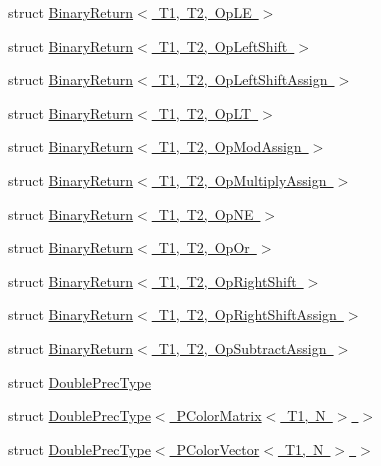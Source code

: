 \begin{DoxyCompactItemize}
\item 
struct \mbox{\hyperlink{structENSEM_1_1BinaryReturn_3_01T1_00_01T2_00_01OpLE_01_4}{Binary\+Return$<$ T1, T2, Op\+L\+E $>$}}
\item 
struct \mbox{\hyperlink{structENSEM_1_1BinaryReturn_3_01T1_00_01T2_00_01OpLeftShift_01_4}{Binary\+Return$<$ T1, T2, Op\+Left\+Shift $>$}}
\item 
struct \mbox{\hyperlink{structENSEM_1_1BinaryReturn_3_01T1_00_01T2_00_01OpLeftShiftAssign_01_4}{Binary\+Return$<$ T1, T2, Op\+Left\+Shift\+Assign $>$}}
\item 
struct \mbox{\hyperlink{structENSEM_1_1BinaryReturn_3_01T1_00_01T2_00_01OpLT_01_4}{Binary\+Return$<$ T1, T2, Op\+L\+T $>$}}
\item 
struct \mbox{\hyperlink{structENSEM_1_1BinaryReturn_3_01T1_00_01T2_00_01OpModAssign_01_4}{Binary\+Return$<$ T1, T2, Op\+Mod\+Assign $>$}}
\item 
struct \mbox{\hyperlink{structENSEM_1_1BinaryReturn_3_01T1_00_01T2_00_01OpMultiplyAssign_01_4}{Binary\+Return$<$ T1, T2, Op\+Multiply\+Assign $>$}}
\item 
struct \mbox{\hyperlink{structENSEM_1_1BinaryReturn_3_01T1_00_01T2_00_01OpNE_01_4}{Binary\+Return$<$ T1, T2, Op\+N\+E $>$}}
\item 
struct \mbox{\hyperlink{structENSEM_1_1BinaryReturn_3_01T1_00_01T2_00_01OpOr_01_4}{Binary\+Return$<$ T1, T2, Op\+Or $>$}}
\item 
struct \mbox{\hyperlink{structENSEM_1_1BinaryReturn_3_01T1_00_01T2_00_01OpRightShift_01_4}{Binary\+Return$<$ T1, T2, Op\+Right\+Shift $>$}}
\item 
struct \mbox{\hyperlink{structENSEM_1_1BinaryReturn_3_01T1_00_01T2_00_01OpRightShiftAssign_01_4}{Binary\+Return$<$ T1, T2, Op\+Right\+Shift\+Assign $>$}}
\item 
struct \mbox{\hyperlink{structENSEM_1_1BinaryReturn_3_01T1_00_01T2_00_01OpSubtractAssign_01_4}{Binary\+Return$<$ T1, T2, Op\+Subtract\+Assign $>$}}
\item 
struct \mbox{\hyperlink{structENSEM_1_1DoublePrecType}{Double\+Prec\+Type}}
\item 
struct \mbox{\hyperlink{structENSEM_1_1DoublePrecType_3_01PColorMatrix_3_01T1_00_01N_01_4_01_4}{Double\+Prec\+Type$<$ P\+Color\+Matrix$<$ T1, N $>$ $>$}}
\item 
struct \mbox{\hyperlink{structENSEM_1_1DoublePrecType_3_01PColorVector_3_01T1_00_01N_01_4_01_4}{Double\+Prec\+Type$<$ P\+Color\+Vector$<$ T1, N $>$ $>$}}
\item 

\end{DoxyCompactItemize}
